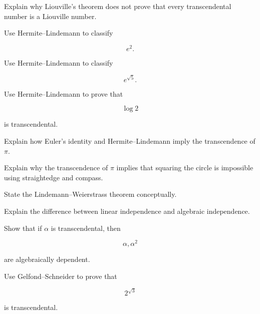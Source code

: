 \begin{exercise}[2]
Explain why Liouville's theorem does not prove that every transcendental
number is a Liouville number.
\end{exercise}

\begin{exercise}[1]
Use Hermite--Lindemann to classify

\[ e^2. \]
\end{exercise}

\begin{exercise}[1]
Use Hermite--Lindemann to classify

\[ e^{\sqrt5}. \]
\end{exercise}

\begin{exercise}[2]
Use Hermite--Lindemann to prove that

\[ \log2 \]

is transcendental.
\end{exercise}

\begin{exercise}[2]
Explain how Euler's identity and Hermite--Lindemann imply the transcendence
of \(\pi\).
\end{exercise}

\begin{exercise}[2]
Explain why the transcendence of \(\pi\) implies that squaring the circle is
impossible using straightedge and compass.
\end{exercise}

\begin{exercise}[2]
State the Lindemann--Weierstrass theorem conceptually.
\end{exercise}

\begin{exercise}[2]
Explain the difference between linear independence and algebraic
independence.
\end{exercise}

\begin{exercise}[2]
Show that if \(\alpha\) is transcendental, then

\[ \alpha,\alpha^2 \]

are algebraically dependent.
\end{exercise}

\begin{exercise}[1]
Use Gelfond--Schneider to prove that

\[ 2^{\sqrt3} \]

is transcendental.
\end{exercise}


